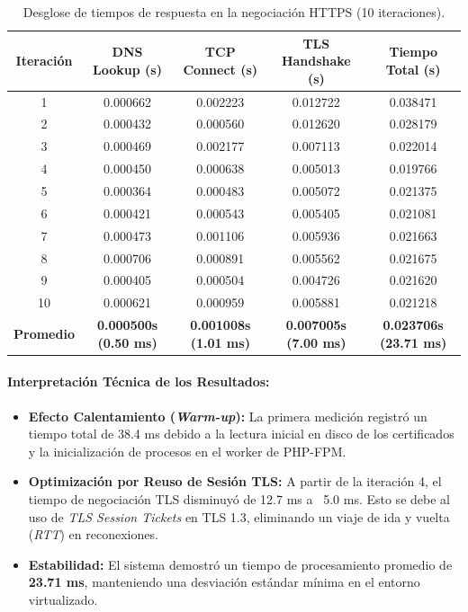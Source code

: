 \documentclass[12pt,a4paper]{article}
\begin{document}
\begin{table}[h!]
\centering
\small
\begin{tabular}{|c|c|c|c|c|}
\hline
\textbf{Iteración} & \textbf{DNS Lookup (s)} & \textbf{TCP Connect (s)} & \textbf{TLS Handshake (s)} & \textbf{Tiempo Total (s)} \\ \hline
1 & 0.000662 & 0.002223 & 0.012722 & 0.038471 \\ \hline
2 & 0.000432 & 0.000560 & 0.012620 & 0.028179 \\ \hline
3 & 0.000469 & 0.002177 & 0.007113 & 0.022014 \\ \hline
4 & 0.000450 & 0.000638 & 0.005013 & 0.019766 \\ \hline
5 & 0.000364 & 0.000483 & 0.005072 & 0.021375 \\ \hline
6 & 0.000421 & 0.000543 & 0.005405 & 0.021081 \\ \hline
7 & 0.000473 & 0.001106 & 0.005936 & 0.021663 \\ \hline
8 & 0.000706 & 0.000891 & 0.005562 & 0.021675 \\ \hline
9 & 0.000405 & 0.000504 & 0.004726 & 0.021620 \\ \hline
10 & 0.000621 & 0.000959 & 0.005881 & 0.021218 \\ \hline
\textbf{Promedio} & \textbf{0.000500s (0.50 ms)} & \textbf{0.001008s (1.01 ms)} & \textbf{0.007005s (7.00 ms)} & \textbf{0.023706s (23.71 ms)} \\ \hline
\end{tabular}
\caption{Desglose de tiempos de respuesta en la negociación HTTPS (10 iteraciones).}
\label{tab:rendimiento}
\end{table}

\paragraph{Interpretación Técnica de los Resultados:}
\begin{itemize}
    \item \textbf{Efecto Calentamiento (\textit{Warm-up}):} La primera medición registró un tiempo total de 38.4 ms debido a la lectura inicial en disco de los certificados y la inicialización de procesos en el worker de PHP-FPM.
    \item \textbf{Optimización por Reuso de Sesión TLS:} A partir de la iteración 4, el tiempo de negociación TLS disminuyó de 12.7 ms a ~5.0 ms. Esto se debe al uso de \textit{TLS Session Tickets} en TLS 1.3, eliminando un viaje de ida y vuelta (\textit{RTT}) en reconexiones.
    \item \textbf{Estabilidad:} El sistema demostró un tiempo de procesamiento promedio de \textbf{23.71 ms}, manteniendo una desviación estándar mínima en el entorno virtualizado.
\end{itemize}
\end{document}
